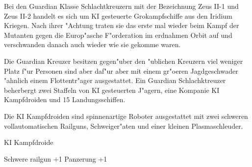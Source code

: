 
Bei den Guardian Klasse Schlachtkreuzern mit der Bezeichnung Zeus II-1 und Zeus II-2 handelt es sich um KI gesteuerte Gro\3kampfschiffe aus den Iridium Kriegen. Nach ihrer "Achtung traten sie das erste mal wieder beim Kampf der Mutanten gegen die Europ"asche F"orderation im erdnahmen Orbit auf und verschwanden danach auch wieder wie sie gekomme waren.

Die Guardian Kreuzer besitzen gegen"uber den "ublichen Kreuzern viel weniger Platz f"ur Personen sind aber daf"ur aber mit einem gr"o\3eren Jagdgeschwader "ahnlich einem Flottentr"ager ausgestattet. Ein Guardian Schlachktreuzer beherbergt zwei Staffeln von KI gesteuerten J"agern, eine Kompanie KI Kampfdroiden und 15 Landungsschiffen.

Die KI Kampfdroiden sind spinnenartige Roboter ausgestattet mit zwei schweren vollautomatischen Railguns, Schwei\3ger"aten und einer kleinen Plasmaschleuder.

\begin{nscsheet}[f]{KI Kampfdroide}
    \nscstats[ATT=3,AGG=3,CON=2]
    \nscruler
    \begin{nscinventory}
        \nscitem[Waffen] Schwere railgun +1
        \nscitem[R"ustung] Panzerung +1
    \end{nscinventory}
\end{nscsheet}
